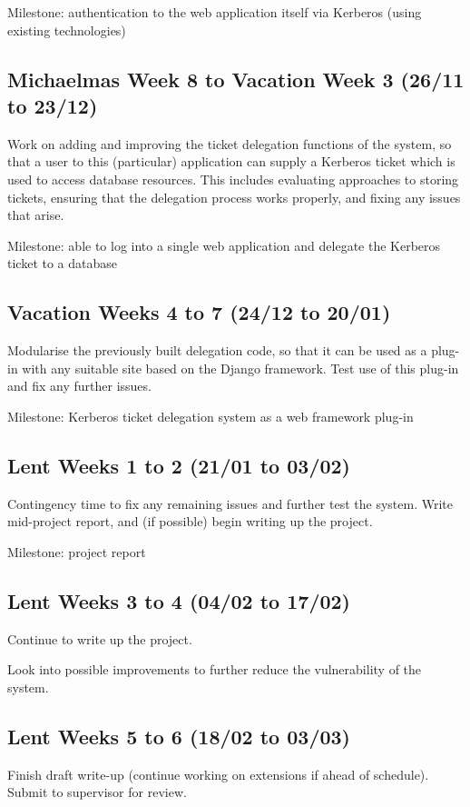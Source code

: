 \documentclass{standalone}
\begin{document}
Milestone: authentication to the web application itself via Kerberos (using existing technologies)

\subsection*{Michaelmas Week 8 to Vacation Week 3 (26/11 to 23/12)}
Work on adding and improving the ticket delegation functions of the system, so that a user to this (particular) application can supply a Kerberos ticket which is used to access database resources. This includes evaluating approaches to storing tickets, ensuring that the delegation process works properly, and fixing any issues that arise.

Milestone: able to log into a single web application and delegate the Kerberos ticket to a database

\subsection*{Vacation Weeks 4 to 7 (24/12 to 20/01)}
Modularise the previously built delegation code, so that it can be used as a plug-in with any suitable site based on the Django framework. Test use of this plug-in and fix any further issues.

Milestone: Kerberos ticket delegation system as a web framework plug-in

\subsection*{Lent Weeks 1 to 2 (21/01 to 03/02)}
Contingency time to fix any remaining issues and further test the system.
Write mid-project report, and (if possible) begin writing up the project.

Milestone: project report

\subsection*{Lent Weeks 3 to 4 (04/02 to 17/02)}
Continue to write up the project.

Look into possible improvements to further reduce the vulnerability of the system.

\subsection*{Lent Weeks 5 to 6 (18/02 to 03/03)}
Finish draft write-up (continue working on extensions if ahead of schedule). Submit to supervisor for review.
\end{document}

